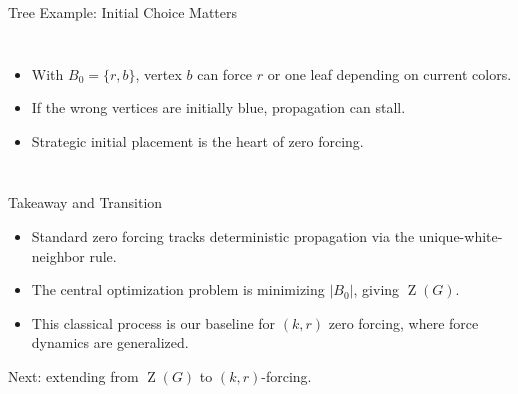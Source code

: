 \documentclass{beamer}
\newcommand{\abs}[1]{\left\vert#1\right\vert}
\theoremstyle{definition}
\DeclareMathOperator{\Z}{Z}
\begin{document}
\begin{frame}{Tree Example: Initial Choice Matters}
\small
\begin{columns}[T,totalwidth=\textwidth]
\centering
{}

\begin{itemize}
  \item With $B_0=\{r,b\}$, vertex $b$ can force $r$ or one leaf depending on current colors.
  \item If the wrong vertices are initially blue, propagation can stall.
  \item Strategic initial placement is the heart of zero forcing.
\end{itemize}
\end{columns}
\end{frame}

\begin{frame}{Takeaway and Transition}
\small
\begin{itemize}
  \item Standard zero forcing tracks deterministic propagation via the unique-white-neighbor rule.
  \item The central optimization problem is minimizing $\abs{B_0}$, giving $\Z(G)$.
  \item This classical process is our baseline for $(k,r)$ zero forcing, where force dynamics are generalized.
\end{itemize}

\vspace{0.35em}
\centering
\large Next: extending from $\Z(G)$ to $(k,r)$-forcing.
\end{frame}
\end{document}
